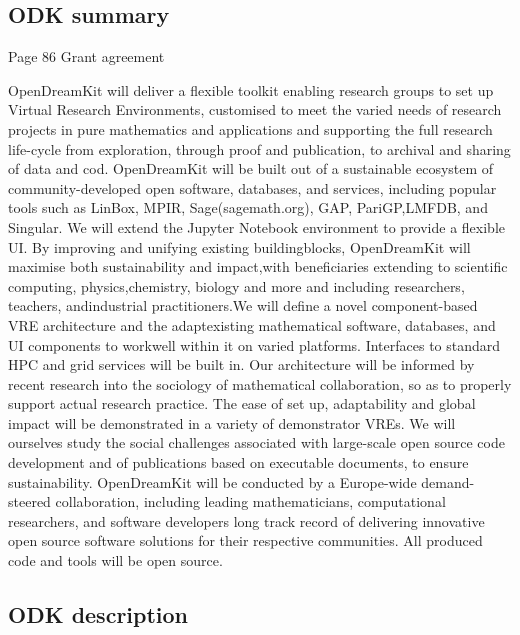 \documentclass[12pt]{amsbook}
\begin{document}
\subsection{ODK summary}
Page 86 Grant agreement


OpenDreamKit will deliver a flexible toolkit enabling research groups to set up Virtual Research Environments,
customised to meet the varied needs of research projects in pure mathematics and applications and supporting
the full research life-cycle from exploration, through proof and publication, to archival and sharing of data and
cod. OpenDreamKit will be built out of a sustainable ecosystem of community-developed open software, databases,
and services, including popular tools such as LinBox, MPIR, Sage(sagemath.org), GAP, PariGP,LMFDB, and
Singular. We will extend the Jupyter Notebook environment to provide a flexible UI. By improving and unifying
existing buildingblocks, OpenDreamKit will maximise both sustainability and impact,with beneficiaries extending
to scientific computing, physics,chemistry, biology and more and including researchers, teachers, andindustrial
practitioners.We will define a novel component-based VRE architecture and the adaptexisting mathematical software,
databases, and UI components to workwell within it on varied platforms. Interfaces to standard HPC and  grid
services will be built in. Our architecture will be informed by recent research into the sociology of mathematical
collaboration, so as to properly support actual research practice. The ease of set up, adaptability and global impact
will be demonstrated in a variety of demonstrator VREs. We will ourselves study the social challenges associated
with large-scale open source code development and of publications based on executable documents, to ensure
sustainability. OpenDreamKit will be conducted by a Europe-wide demand-steered collaboration, including leading
mathematicians, computational researchers, and software developers long track record of delivering innovative open
source software solutions for their respective communities. All produced code and tools will be open source.

\subsection{ODK description}
\end{document}
